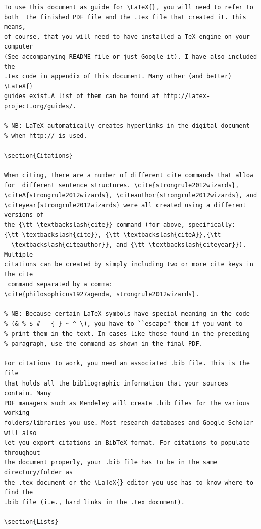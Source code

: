 \documentclass[12pt]{article}
\begin{document}
\begin{verbatim}
To use this document as guide for \LaTeX{}, you will need to refer to
both  the finished PDF file and the .tex file that created it. This means, 
of course, that you will need to have installed a TeX engine on your computer 
(See accompanying README file or just Google it). I have also included the 
.tex code in appendix of this document. Many other (and better) \LaTeX{} 
guides exist.A list of them can be found at http://latex-project.org/guides/.

% NB: LaTeX automatically creates hyperlinks in the digital document
% when http:// is used.

\section{Citations}

When citing, there are a number of different cite commands that allow
for  different sentence structures. \cite{strongrule2012wizards},
\citeA{strongrule2012wizards}, \citeauthor{strongrule2012wizards}, and
\citeyear{strongrule2012wizards} were all created using a different versions of
the {\tt \textbackslash{cite}} command (for above, specifically:
{\tt \textbackslash{cite}}, {\tt \textbackslash{citeA}},{\tt
  \textbackslash{citeauthor}}, and {\tt \textbackslash{citeyear}}). Multiple 
citations can be created by simply including two or more cite keys in the cite
 command separated by a comma: 
\cite{philosophicus1927agenda, strongrule2012wizards}.

% NB: Because certain LaTeX symbols have special meaning in the code
% (& % $ # _ { } ~ ^ \), you have to ``escape" them if you want to
% print them in the text. In cases like those found in the preceding
% paragraph, use the command as shown in the final PDF.

For citations to work, you need an associated .bib file. This is the file 
that holds all the bibliographic information that your sources contain. Many 
PDF managers such as Mendeley will create .bib files for the various working 
folders/libraries you use. Most research databases and Google Scholar will also 
let you export citations in BibTeX format. For citations to populate throughout 
the document properly, your .bib file has to be in the same directory/folder as 
the .tex document or the \LaTeX{} editor you use has to know where to find the 
.bib file (i.e., hard links in the .tex document).

\section{Lists}


\end{verbatim}
\end{document}
